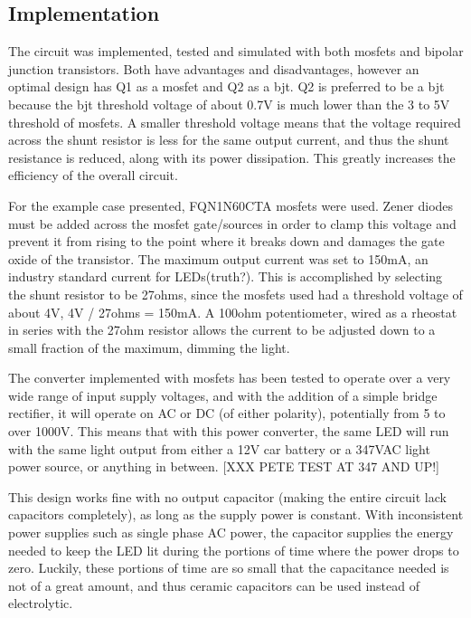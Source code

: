 \documentclass[conference]{IEEEtran}
\begin{document}
\subsection{Implementation}
The circuit was implemented, tested and simulated with both mosfets and bipolar junction transistors. Both have advantages and disadvantages, however an optimal design has Q1 as a mosfet and Q2 as a bjt. Q2 is preferred to be a bjt because the bjt threshold voltage of about 0.7V is much lower than the 3 to 5V threshold of mosfets. A smaller threshold voltage means that the voltage required across the shunt resistor is less for the same output current, and thus the shunt resistance is reduced, along with its power dissipation. This greatly increases the efficiency of the overall circuit.

For the example case presented, FQN1N60CTA mosfets were used. Zener diodes must be added across the mosfet gate/sources in order to clamp this voltage and prevent it from rising to the point where it breaks down and damages the gate oxide of the transistor. The maximum output current was set to 150mA, an industry standard current for LEDs(truth?). This is accomplished by selecting the shunt resistor to be 27ohms, since the mosfets used had a threshold voltage of about 4V, 4V / 27ohms = 150mA. A 100ohm potentiometer, wired as a rheostat in series with the 27ohm resistor allows the current to be adjusted down to a small fraction of the maximum, dimming the light. 

The converter implemented with mosfets has been tested to operate over a very wide range of input supply voltages, and with the addition of a simple bridge rectifier, it will operate on AC or DC (of either polarity), potentially from 5 to over 1000V. This means that with this power converter, the same LED will run with the same light output from either a 12V car battery or a 347VAC light power source, or anything in between. [XXX PETE TEST AT 347 AND UP!]

This design works fine with no output capacitor (making the entire circuit lack capacitors completely), as long as the supply power is constant. With inconsistent power supplies such as single phase AC power, the capacitor supplies the energy needed to keep the LED lit during the portions of time where the power drops to zero. Luckily, these portions of time are so small that the capacitance needed is not of a great amount, and thus ceramic capacitors can be used instead of electrolytic.
\end{document}
